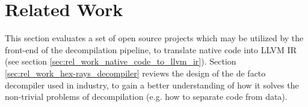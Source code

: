 
\section{Related Work}
\label{sec:related_work}

This section evaluates a set of open source projects which may be utilized by the front-end of the decompilation pipeline, to translate native code into LLVM IR (see section \ref{sec:rel_work_native_code_to_llvm_ir}). Section \ref{sec:rel_work_hex-rays_decompiler} reviews the design of the de facto decompiler used in industry, to gain a better understanding of how it solves the non-trivial problems of decompilation (e.g. how to separate code from data).




